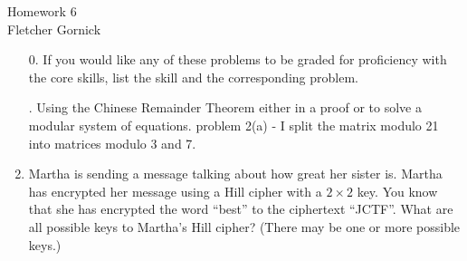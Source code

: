\documentclass[12pt]{article}
\newcommand{\n}{\vspace{0.5cm}}
\begin{document}
  \begin{center}
    {\Large Homework 6} \n\\
    Fletcher Gornick
  \end{center}

\begin{enumerate}
  \item[0.] If you would like any of these problems to be graded for proficiency with the core skills, list the skill and the corresponding problem. 
      \begin{outline}
        . Using the Chinese Remainder Theorem either in a proof or to solve a modular system of equations.
          \2 problem 2(a) - I split the matrix modulo 21 into matrices modulo 3 and 7.
      \end{outline} \n

  \item Martha is sending a message talking about how great her sister is.  Martha has encrypted her message using a Hill cipher with a \(2\times 2\) key.  You know that she has encrypted the word ``best'' to the ciphertext ``JCTF''.  What are all possible keys to Martha's Hill cipher? (There may be one or more possible keys.)


\end{enumerate}
\end{document}
